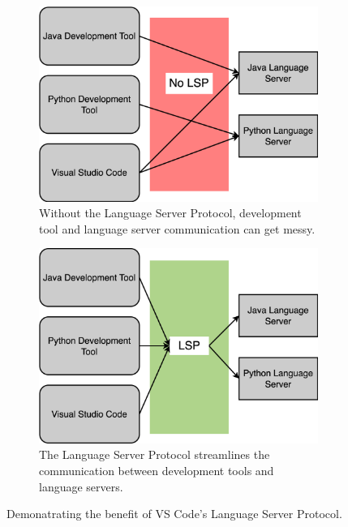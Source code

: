 \documentclass{article}
\begin{document}
\begin{figure}
    \begin{subfigure}[c][][c]{0.45\textwidth}
        \begin{center}
            \includegraphics[width=\textwidth]{png/no-lsp-theory.png}
            \caption{Without the Language Server Protocol, development tool and language server communication can get messy.}
            \label{fig:no-lsp-theory}
        \end{center}
    \end{subfigure}
    \hspace{0.05\textwidth}
    \begin{subfigure}[c][][c]{0.45\textwidth}
        \begin{center}
            \includegraphics[width=\textwidth]{png/lsp-theory.png}
            \caption{The Language Server Protocol streamlines the communication between development tools and language servers.}
            \label{fig:lsp-theory}
        \end{center}
    \end{subfigure}
    \caption{Demonatrating the benefit of VS Code's Language Server Protocol.}
    \label{fig:lsp}
\end{figure}
\end{document}
